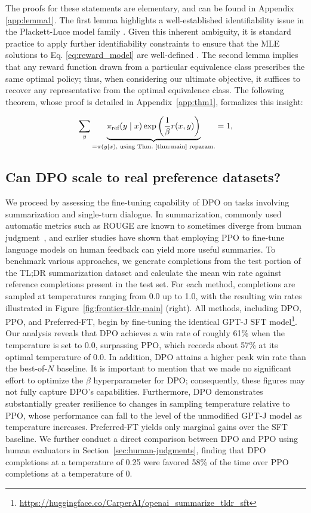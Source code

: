 The proofs for these statements are elementary, and can be found in Appendix \ref{app:lemma1}. The first lemma highlights a well-established identifiability issue in the Plackett-Luce model family \cite{plackett1975analysis}. Given this inherent ambiguity, it is standard practice to apply further identifiability constraints to ensure that the MLE solutions to Eq. \ref{eq:reward_model} are well-defined \cite{bong2022generalized}. The second lemma implies that any reward function drawn from a particular equivalence class prescribes the same optimal policy; thus, when considering our ultimate objective, it suffices to recover any representative from the optimal equivalence class. The following theorem, whose proof is detailed in Appendix~\ref{app:thm1}, formalizes this insight:

\begin{equation}\label{eq:lag_p}
     \sum_{y}\underbrace{\pi_\text{ref}(y\mid x)\exp\left(\frac{1}{\beta}r(x, y)\right)}_{=\pi(y\mid x)\text{, using Thm.~\ref{thm:main} reparam.}} = 1,
\end{equation}

\subsection{Can DPO scale to real preference datasets?}
\label{sec:dpo-real-datasets}
We proceed by assessing the fine-tuning capability of DPO on tasks involving summarization and single-turn dialogue. In summarization, commonly used automatic metrics such as ROUGE are known to sometimes diverge from human judgment~\citep{stiennon2022learning}, and earlier studies have shown that employing PPO to fine-tune language models on human feedback can yield more useful summaries. To benchmark various approaches, we generate completions from the test portion of the TL;DR summarization dataset and calculate the mean win rate against reference completions present in the test set. For each method, completions are sampled at temperatures ranging from 0.0 up to 1.0, with the resulting win rates illustrated in Figure~\ref{fig:frontier-tldr-main} (right). All methods, including DPO, PPO, and Preferred-FT, begin by fine-tuning the identical GPT-J SFT model\footnote{\url{https://huggingface.co/CarperAI/openai_summarize_tldr_sft}}. Our analysis reveals that DPO achieves a win rate of roughly 61\% when the temperature is set to 0.0, surpassing PPO, which records about 57\% at its optimal temperature of 0.0. In addition, DPO attains a higher peak win rate than the best-of-$N$ baseline. It is important to mention that we made no significant effort to optimize the $\beta$ hyperparameter for DPO; consequently, these figures may not fully capture DPO's capabilities. Furthermore, DPO demonstrates substantially greater resilience to changes in sampling temperature relative to PPO, whose performance can fall to the level of the unmodified GPT-J model as temperature increases. Preferred-FT yields only marginal gains over the SFT baseline. We further conduct a direct comparison between DPO and PPO using human evaluators in Section~\ref{sec:human-judgments}, finding that DPO completions at a temperature of 0.25 were favored 58\% of the time over PPO completions at a temperature of 0.

